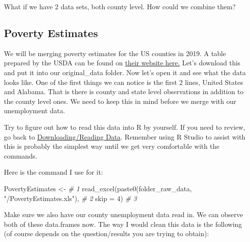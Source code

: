\documentclass[
]{book}
\newenvironment{Shaded}{\begin{snugshade}}{\end{snugshade}}
\newcommand{\AttributeTok}[1]{\textcolor[rgb]{0.77,0.63,0.00}{#1}}
\newcommand{\CommentTok}[1]{\textcolor[rgb]{0.56,0.35,0.01}{\textit{#1}}}
\newcommand{\DecValTok}[1]{\textcolor[rgb]{0.00,0.00,0.81}{#1}}
\newcommand{\FunctionTok}[1]{\textcolor[rgb]{0.00,0.00,0.00}{#1}}
\newcommand{\NormalTok}[1]{#1}
\newcommand{\OtherTok}[1]{\textcolor[rgb]{0.56,0.35,0.01}{#1}}
\newcommand{\StringTok}[1]{\textcolor[rgb]{0.31,0.60,0.02}{#1}}
\begin{document}
What if we have 2 data sets, both county level. How could we combine them?

\hypertarget{poverty-estimates}{%
\subsection{Poverty Estimates}\label{poverty-estimates}}

We will be merging poverty estimates for the US counties in 2019. A table prepared by the USDA can be found on \href{https://www.ers.usda.gov/data-products/county-level-data-sets/download-data/}{their website here.} Let's download this and put it into our original\_data folder. Now let's open it and see what the data looks like. One of the first things we can notice is the first 2 lines, United States and Alabama. That is there is county and state level observations in addition to the county level ones. We need to keep this in mind before we merge with our unemployment data.

Try to figure out how to read this data into R by yourself. If you need to review, go back to \href{https://jmwestenberg.github.io/courses/rcourse/lesson1/lesson1_04/}{Downloading/Reading Data}. Remember using R Studio to assist with this is probably the simplest way until we get very comfortable with the commands.

Here is the command I use for it:

\begin{Shaded}
\begin{Highlighting}[]
\NormalTok{PovertyEstimates }\OtherTok{\textless{}{-}}                                             \CommentTok{\# 1}
  \FunctionTok{read\_excel}\NormalTok{(}\FunctionTok{paste0}\NormalTok{(folder\_raw\_data, }\StringTok{"/PovertyEstimates.xls"}\NormalTok{),  }\CommentTok{\# 2}
  \AttributeTok{skip =} \DecValTok{4}\NormalTok{)                                                     }\CommentTok{\# 3}
\end{Highlighting}
\end{Shaded}

Make sure we also have our county unemployment data read in. We can observe both of these data.frames now. The way I would clean this data is the following (of course depends on the question/results you are trying to obtain):
\end{document}
